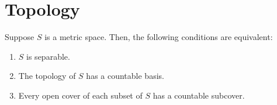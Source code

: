 

\section{Topology}
\setcounter{theorem}{0}
\setcounter{equation}{0}

\renewcommand{\theenumi}{\roman{enumi}}
\renewcommand{\labelenumi}{\textnormal{(\theenumi)}$\;\;$}

\begin{theorem}
\label{CharacterizationOfSeparabilityOfMetricSpaces}
\mbox{}\vskip 0.1cm
\noindent
Suppose $S$ is a metric space. Then, the following conditions are equivalent:
\begin{enumerate}
\item	$S$ is separable.
\item	The topology of $S$ has a countable basis.
\item	Every open cover of {\color{red}each subset} of $S$ has a countable subcover.
\end{enumerate}
\end{theorem}

